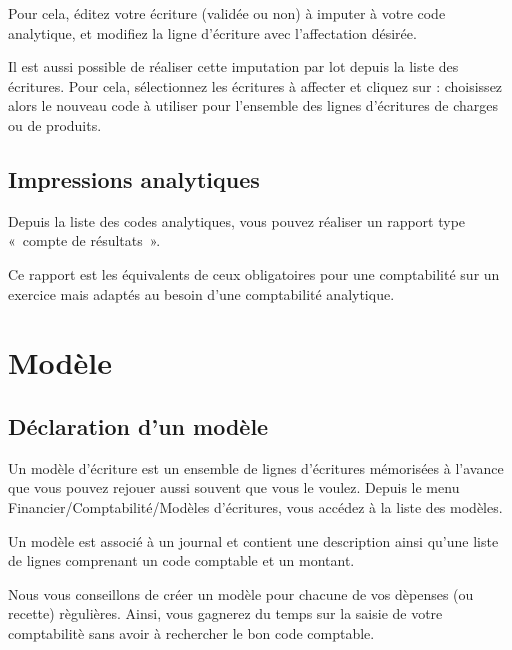 \documentclass[a4paper,10pt,oneside,french]{sphinxmanual}
\begin{document}
Pour cela, éditez votre écriture (validée ou non) à imputer à votre code analytique, et modifiez la ligne d’écriture avec l’affectation désirée.

Il est aussi possible de réaliser cette imputation par lot depuis la liste des écritures.
Pour cela, sélectionnez les écritures à affecter et cliquez sur : choisissez alors le nouveau code à utiliser
pour l’ensemble des lignes d’écritures de charges ou de produits.


\subsection{Impressions analytiques}
\label{\detokenize{accounting/costaccounting:impressions-analytiques}}
Depuis la liste des codes analytiques, vous pouvez réaliser un rapport type « compte de résultats ».

Ce rapport est les équivalents de ceux obligatoires pour une comptabilité sur un exercice mais adaptés au besoin d’une comptabilité analytique.


\section{Modèle}
\label{\detokenize{accounting/model:modele}}\label{\detokenize{accounting/model::doc}}

\subsection{Déclaration d’un modèle}
\label{\detokenize{accounting/model:declaration-d-un-modele}}
Un modèle d’écriture est un ensemble de lignes d’écritures mémorisées à l’avance que vous pouvez rejouer aussi souvent que vous le voulez.
Depuis le menu Financier/Comptabilité/Modèles d’écritures, vous accédez à la liste des modèles.
\begin{quote}

\noindent{}
\end{quote}

Un modèle est associé à un journal et contient une description ainsi qu’une liste de lignes comprenant un code comptable et un montant.
\begin{quote}

\noindent{}
\end{quote}

Nous vous conseillons de créer un modèle pour chacune de vos dèpenses (ou recette) règulières. Ainsi, vous gagnerez du temps sur la saisie de votre comptabilitè sans avoir à rechercher le bon code comptable.
\end{document}
